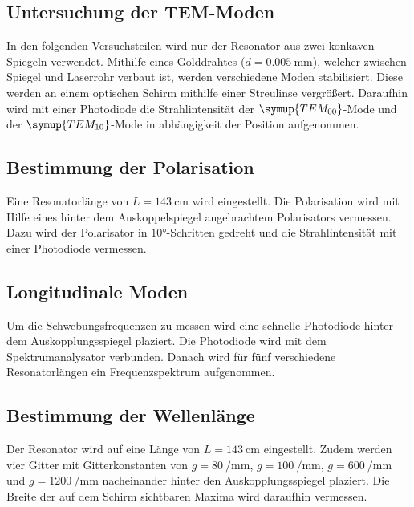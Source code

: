 \subsection{Untersuchung der TEM-Moden}
In den folgenden Versuchsteilen wird nur der Resonator aus zwei konkaven Spiegeln verwendet.
Mithilfe eines Golddrahtes ($d = \SI{0.005}{\milli\meter}$), welcher zwischen Spiegel und Laserrohr verbaut ist,
werden verschiedene Moden stabilisiert. Diese werden an einem optischen Schirm mithilfe einer Streulinse vergrößert.
Daraufhin wird mit einer Photodiode die Strahlintensität der $\symup{TEM_{00}}$-Mode und der $\symup{TEM_{10}}$-Mode in abhängigkeit der Position aufgenommen.

\subsection{Bestimmung der Polarisation}
Eine Resonatorlänge von $L = \SI{143}{\centi\meter}$ wird eingestellt.
Die Polarisation wird mit Hilfe eines hinter dem Auskoppelspiegel angebrachtem Polarisators vermessen. 
Dazu wird der Polarisator in $\ang{10}$-Schritten gedreht und die Strahlintensität mit einer Photodiode vermessen.

\subsection{Longitudinale Moden}
Um die Schwebungsfrequenzen zu messen wird eine schnelle Photodiode hinter dem Auskopplungsspiegel plaziert.
Die Photodiode wird mit dem Spektrumanalysator verbunden.
Danach wird für fünf verschiedene Resonatorlängen ein Frequenzspektrum aufgenommen.

\subsection{Bestimmung der Wellenlänge}
Der Resonator wird auf eine Länge von $L = \SI{143}{\centi\meter}$ eingestellt.
Zudem werden vier Gitter mit Gitterkonstanten von $g = \SI{80}{\per\milli\meter}$, 
$g = \SI{100}{\per\milli\meter}$, $g = \SI{600}{\per\milli\meter}$ und $g = \SI{1200}{\per\milli\meter}$
nacheinander hinter den Auskopplungsspiegel plaziert. 
Die Breite der auf dem Schirm sichtbaren Maxima wird daraufhin vermessen.
